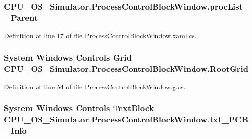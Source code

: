 \subsubsection[{proc\+List\+\_\+\+Parent}]{ C\+P\+U\+\_\+\+O\+S\+\_\+\+Simulator.\+Process\+Control\+Block\+Window.\+proc\+List\+\_\+\+Parent\hspace{0.3cm}{\ttfamily [private]}}\label{class_c_p_u___o_s___simulator_1_1_process_control_block_window_a63c162f28cabcf42add4094087a10e68}


Definition at line 17 of file Process\+Control\+Block\+Window.\+xaml.\+cs.

\hypertarget{class_c_p_u___o_s___simulator_1_1_process_control_block_window_a415616dfc791b692ef6f5736fd6aeae4}{}
\subsubsection[{Root\+Grid}]{\setlength{\rightskip}{0pt plus 5cm}System Windows Controls Grid C\+P\+U\+\_\+\+O\+S\+\_\+\+Simulator.\+Process\+Control\+Block\+Window.\+Root\+Grid\hspace{0.3cm}{\ttfamily [package]}}\label{class_c_p_u___o_s___simulator_1_1_process_control_block_window_a415616dfc791b692ef6f5736fd6aeae4}


Definition at line 54 of file Process\+Control\+Block\+Window.\+g.\+cs.

\hypertarget{class_c_p_u___o_s___simulator_1_1_process_control_block_window_af88f289c3eba55631106b52e491fa137}{}
\subsubsection[{txt\+\_\+\+P\+C\+B\+\_\+\+Info}]{\setlength{\rightskip}{0pt plus 5cm}System Windows Controls Text\+Block C\+P\+U\+\_\+\+O\+S\+\_\+\+Simulator.\+Process\+Control\+Block\+Window.\+txt\+\_\+\+P\+C\+B\+\_\+\+Info\hspace{0.3cm}{\ttfamily [package]}}\label{class_c_p_u___o_s___simulator_1_1_process_control_block_window_af88f289c3eba55631106b52e491fa137}


